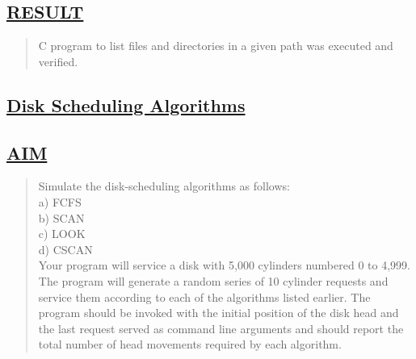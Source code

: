 \documentclass[a4paper, 12pt]{article}
\begin{document}

\subsection*{\underline{RESULT}}
\begin{quote}
C program to list files and directories in a given path was executed and verified.
\end{quote}

\newpage
\begin{center}
\section*{\LARGE \textbf{\underline{Disk Scheduling Algorithms}}} 
\end{center}

\subsection*{\underline{AIM}}
\begin{quote}
Simulate the disk-scheduling algorithms as follows:\\
a) FCFS\\
b) SCAN\\
c) LOOK\\
d) CSCAN\\
Your program will service a disk with 5,000 cylinders numbered 0 to 4,999. The program will generate a random series of 10 cylinder requests and service them according to each of the algorithms listed earlier. The program should be invoked with the initial position of the disk head and the last request served as command line arguments and should report the total number of head movements required by each algorithm.\\
\end{quote}
\end{document}
